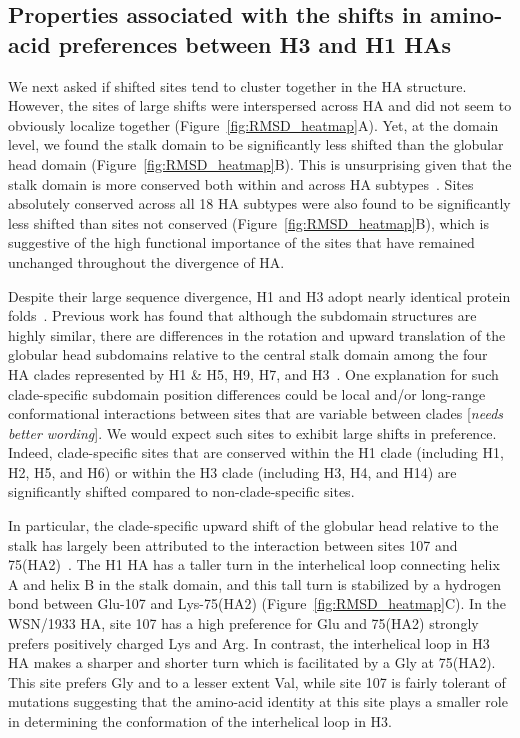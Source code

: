 \documentclass[9pt,twocolumn,twoside]{pnas-new}
\newcommand{\comment}[1]{{\color{red}[\textsl{#1}]}}
\begin{document}
\subsection*{Properties associated with the shifts in amino-acid preferences between H3 and H1 HAs}

We next asked if shifted sites tend to cluster together in the HA structure.
However, the sites of large shifts were interspersed across HA and did not seem to obviously localize together (Figure~\ref{fig:RMSD_heatmap}A).
Yet, at the domain level, we found the stalk domain to be significantly less shifted than the globular head domain (Figure~\ref{fig:RMSD_heatmap}B). 
This is unsurprising given that the stalk domain is more conserved both within and across HA subtypes~\cite{nobusawa1991comparison,hai2012influenza,mallajosyula2014influenza}.
Sites absolutely conserved across all 18 HA subtypes were also found to be significantly less shifted than sites not conserved (Figure~\ref{fig:RMSD_heatmap}B), which is suggestive of the high functional importance of the sites that have remained unchanged throughout the divergence of HA.

Despite their large sequence divergence, H1 and H3 adopt nearly identical protein folds~\cite{ha2002h5,russell2004h1}.
Previous work has found that although the subdomain structures are highly similar, there are differences in the rotation and upward translation of the globular head subdomains relative to the central stalk domain among the four HA clades represented by H1 \& H5, H9, H7, and H3~\cite{ha2002h5,russell2004h1}.
One explanation for such clade-specific subdomain position differences could be local and/or long-range conformational interactions between sites that are variable between clades \comment{needs better wording}.
We would expect such sites to exhibit large shifts in preference.
Indeed, clade-specific sites that are conserved within the H1 clade (including H1, H2, H5, and H6) or within the H3 clade (including H3, H4, and H14) are significantly shifted compared to non-clade-specific sites.

In particular, the clade-specific upward shift of the globular head relative to the stalk has largely been attributed to the interaction between sites 107 and 75(HA2)~\cite{ha2002h5,russell2004h1}.
The H1 HA has a taller turn in the interhelical loop connecting helix A and helix B in the stalk domain, and this tall turn is stabilized by a hydrogen bond between Glu-107 and Lys-75(HA2) (Figure~\ref{fig:RMSD_heatmap}C).
In the WSN/1933 HA, site 107 has a high preference for Glu and 75(HA2) strongly prefers positively charged Lys and Arg.
In contrast, the interhelical loop in H3 HA makes a sharper and shorter turn which is facilitated by a Gly at 75(HA2).
This site prefers Gly and to a lesser extent Val, while site 107 is fairly tolerant of mutations suggesting that the amino-acid identity at this site plays a smaller role in determining the conformation of the interhelical loop in H3.
\end{document}
